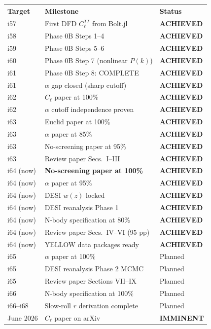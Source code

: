 \documentclass[11pt,a4paper]{article}
\begin{document}
\begin{center}
\begin{longtable}{lll}
\toprule
\textbf{Target} & \textbf{Milestone} & \textbf{Status} \\
\midrule
i57 & First DFD $C_\ell^{TT}$ from Bolt.jl & \textbf{ACHIEVED} \\
i58 & Phase 0B Steps 1--4 & \textbf{ACHIEVED} \\
i59 & Phase 0B Steps 5--6 & \textbf{ACHIEVED} \\
i60 & Phase 0B Step 7 (nonlinear $P(k)$) & \textbf{ACHIEVED} \\
i61 & Phase 0B Step 8: COMPLETE & \textbf{ACHIEVED} \\
i61 & $\alpha$ gap closed (sharp cutoff) & \textbf{ACHIEVED} \\
i62 & $C_\ell$ paper at 100\% & \textbf{ACHIEVED} \\
i62 & $\alpha$ cutoff independence proven & \textbf{ACHIEVED} \\
i63 & Euclid paper at 100\% & \textbf{ACHIEVED} \\
i63 & $\alpha$ paper at 85\% & \textbf{ACHIEVED} \\
i63 & No-screening paper at 95\% & \textbf{ACHIEVED} \\
i63 & Review paper Secs.\ I--III & \textbf{ACHIEVED} \\
i64 (now) & \textbf{No-screening paper at 100\%} & \textbf{ACHIEVED} \\
i64 (now) & $\alpha$ paper at 95\% & \textbf{ACHIEVED} \\
i64 (now) & DESI $w(z)$ locked & \textbf{ACHIEVED} \\
i64 (now) & DESI reanalysis Phase 1 & \textbf{ACHIEVED} \\
i64 (now) & N-body specification at 80\% & \textbf{ACHIEVED} \\
i64 (now) & Review paper Secs.\ IV--VI (95 pp) & \textbf{ACHIEVED} \\
i64 (now) & YELLOW data packages ready & \textbf{ACHIEVED} \\
\midrule
i65 & $\alpha$ paper at 100\% & Planned \\
i65 & DESI reanalysis Phase 2 MCMC & Planned \\
i65 & Review paper Sections VII--IX & Planned \\
i66 & N-body specification at 100\% & Planned \\
i66--i68 & Slow-roll $r$ derivation complete & Planned \\
\midrule
June 2026 & $C_\ell$ paper on arXiv & \textbf{IMMINENT} \\

\end{longtable}
\end{center}
\end{document}
